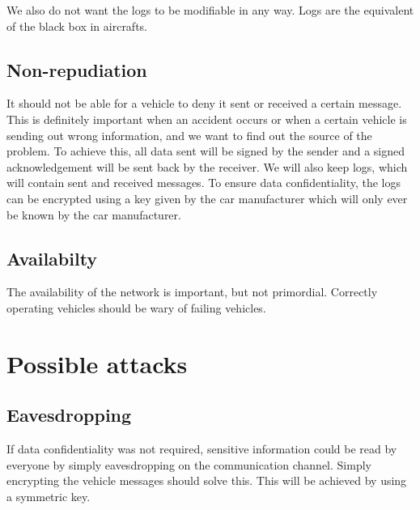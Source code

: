 \documentclass[a4paper, 11pt]{article}
\begin{document}
We also do not want the logs to be modifiable in any way. Logs are the
equivalent of the black box in aircrafts.

\subsection{Non-repudiation}
It should not be able for a vehicle to deny it sent or received a certain
message. This is definitely important when an accident occurs or when a
certain vehicle is sending out wrong information, and we want to find out
the source of the problem. To achieve this, all data sent will be signed
by the sender and a signed acknowledgement will be sent back by the
receiver. We will also keep logs, which will contain sent and received
messages. To ensure data confidentiality, the logs can be encrypted using
a key given by the car manufacturer which will only ever be known by the car manufacturer.

\subsection{Availabilty}
The availability of the network is important, but not primordial. Correctly
operating vehicles should be wary of failing vehicles.

\section{Possible attacks}

\subsection{Eavesdropping}
If data confidentiality was not required, sensitive information could be
read by everyone by simply eavesdropping on the communication channel.
Simply encrypting the vehicle messages should solve this. This will be achieved
by using a symmetric key.
\end{document}
